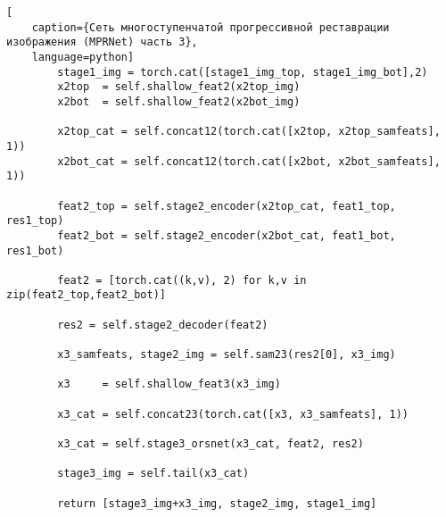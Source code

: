 \begin{lstlisting}[
    caption={Сеть многоступенчатой прогрессивной реставрации изображения (MPRNet) часть 3},
    language=python]
        stage1_img = torch.cat([stage1_img_top, stage1_img_bot],2) 
        x2top  = self.shallow_feat2(x2top_img)
        x2bot  = self.shallow_feat2(x2bot_img)

        x2top_cat = self.concat12(torch.cat([x2top, x2top_samfeats], 1))
        x2bot_cat = self.concat12(torch.cat([x2bot, x2bot_samfeats], 1))

        feat2_top = self.stage2_encoder(x2top_cat, feat1_top, res1_top)
        feat2_bot = self.stage2_encoder(x2bot_cat, feat1_bot, res1_bot)

        feat2 = [torch.cat((k,v), 2) for k,v in zip(feat2_top,feat2_bot)]

        res2 = self.stage2_decoder(feat2)

        x3_samfeats, stage2_img = self.sam23(res2[0], x3_img)

        x3     = self.shallow_feat3(x3_img)

        x3_cat = self.concat23(torch.cat([x3, x3_samfeats], 1))
        
        x3_cat = self.stage3_orsnet(x3_cat, feat2, res2)

        stage3_img = self.tail(x3_cat)

        return [stage3_img+x3_img, stage2_img, stage1_img]
\end{lstlisting}